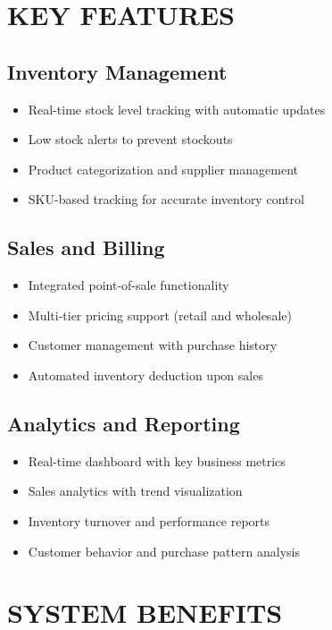\section{KEY FEATURES}

\subsection{Inventory Management}
\begin{itemize}
\item Real-time stock level tracking with automatic updates
\item Low stock alerts to prevent stockouts
\item Product categorization and supplier management
\item SKU-based tracking for accurate inventory control
\end{itemize}

\subsection{Sales and Billing}
\begin{itemize}
\item Integrated point-of-sale functionality
\item Multi-tier pricing support (retail and wholesale)
\item Customer management with purchase history
\item Automated inventory deduction upon sales
\end{itemize}

\subsection{Analytics and Reporting}
\begin{itemize}
\item Real-time dashboard with key business metrics
\item Sales analytics with trend visualization
\item Inventory turnover and performance reports
\item Customer behavior and purchase pattern analysis
\end{itemize}

\section{SYSTEM BENEFITS}

